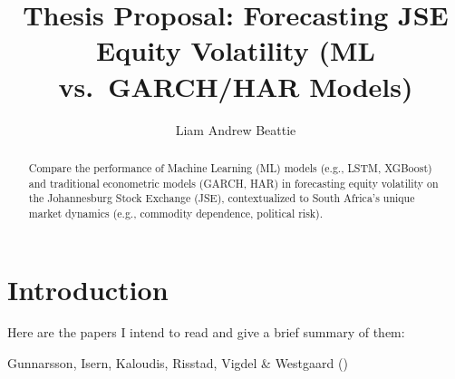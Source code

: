 \documentclass[11pt,preprint]{elsarticle}
\numberwithin{equation}{section}
\numberwithin{figure}{section}
\numberwithin{table}{section}
\begin{document}
\begin{frontmatter}  %

\title{Thesis Proposal: Forecasting JSE Equity Volatility (ML
vs.~GARCH/HAR Models)}





\author[Add1]{Liam Andrew Beattie}





\address[Add1]{Stellenbosch University, South Africa}


\begin{abstract}
\small{
Compare the performance of Machine Learning (ML) models (e.g., LSTM,
XGBoost) and traditional econometric models (GARCH, HAR) in forecasting
equity volatility on the Johannesburg Stock Exchange (JSE),
contextualized to South Africa's unique market dynamics (e.g., commodity
dependence, political risk).
}
\end{abstract}

\vspace{1cm}





\vspace{0.5cm}

\end{frontmatter}

\setcounter{footnote}{0}



\pagestyle{fancy}
\chead{}
\rhead{}
\lfoot{}
\lhead{}
\cfoot{}


\headsep 35pt %




\section{\texorpdfstring{Introduction
\label{Introduction}}{Introduction }}\label{introduction}

Here are the papers I intend to read and give a brief summary of them:

Gunnarsson, Isern, Kaloudis, Risstad, Vigdel \& Westgaard
()
\end{document}
